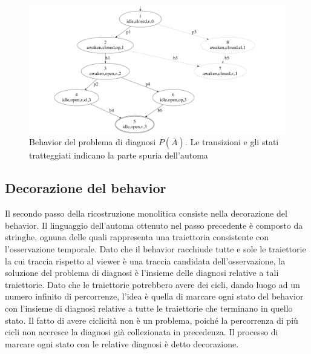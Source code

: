 \begin{figure}[htbp]
\centering
\includegraphics[scale=0.15]{./Img/sa/bhv_s.png}
\caption{Behavior del problema di diagnosi $P(\overline{A})$. Le transizioni e gli stati tratteggiati indicano la parte spuria dell'automa}
\label{fig:bhv}
\end{figure}

\subsection{Decorazione del behavior}
Il secondo passo della ricostruzione monolitica consiste nella decorazione del behavior. Il linguaggio dell'automa ottenuto nel passo precedente è composto da stringhe, ognuna delle quali rappresenta una traiettoria consistente con l'osservazione temporale. Dato che il behavior racchiude tutte e sole le traiettorie la cui traccia rispetto al viewer è una traccia candidata dell'osservazione, la soluzione del problema di diagnosi è l'insieme delle diagnosi relative a tali traiettorie. Dato che le traiettorie potrebbero avere dei cicli, dando luogo ad un numero infinito di percorrenze, l'idea è quella di marcare ogni stato del behavior con l'insieme di diagnosi relative a tutte le traiettorie che terminano in quello stato. Il fatto di avere ciclicità non è un problema, poiché la percorrenza di più cicli non accresce la diagnosi già collezionata in precedenza. Il processo di marcare ogni stato con le relative diagnosi è detto decorazione.

